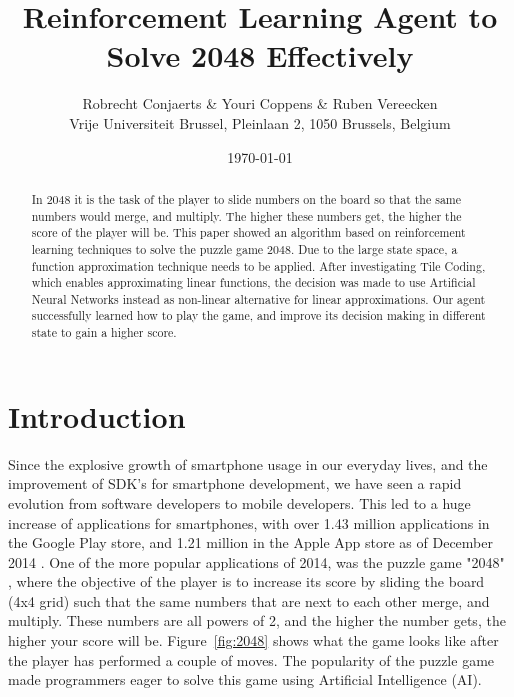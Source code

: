 \documentclass[a4paper,12pt]{article}
\begin{document}
\title{Reinforcement Learning Agent to Solve 2048 Effectively}
\author{
Robrecht Conjaerts \& Youri Coppens \& Ruben Vereecken \\
Vrije Universiteit Brussel, Pleinlaan 2, 1050 Brussels, Belgium \\
}
\date{\today}
\maketitle

\begin{abstract}
In $2048$ it is the task of the player to slide numbers on the board so that the same numbers would merge, and multiply. The higher these numbers get, the higher the score of the player will be. This paper showed an algorithm based on reinforcement learning techniques to solve the puzzle game $2048$.
Due to the large state space, a function approximation technique needs to be applied.
After investigating Tile Coding, which enables approximating linear functions, the decision was made to use Artificial Neural Networks instead as non-linear alternative for linear approximations.
Our agent successfully learned how to play the game, and improve its decision making in different state to gain a higher score.
\end{abstract}

\section{Introduction}
Since the explosive growth of smartphone usage in our everyday lives, and the improvement of SDK's for smartphone development, we have seen a rapid evolution from software developers to mobile developers. This led to a huge increase of applications for smartphones, with over 1.43 million applications in the Google Play store, and 1.21 million in the Apple App store as of December 2014 \cite{appstores}. One of the more popular applications of 2014, was the puzzle game "2048" \cite{2048}, where the objective of the player is to increase its score by sliding the board (4x4 grid) such that the same numbers that are next to each other merge, and multiply. These numbers are all powers of 2, and the higher the number gets, the higher your score will be. Figure~\ref{fig:2048} shows what the game looks like after the player has performed a couple of moves.
The popularity of the puzzle game made programmers eager to solve this game using Artificial Intelligence (AI).\cite{underflow,ov3y,nneo}
\end{document}
